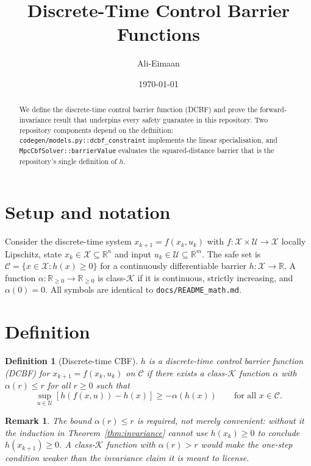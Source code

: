\documentclass[11pt]{article}
\title{Discrete-Time Control Barrier Functions}
\author{Ali-Eimaan}
\date{\today}
\newtheorem{definition}{Definition}
\newtheorem{remark}{Remark}
\begin{document}
\maketitle

\begin{abstract}
We define the discrete-time control barrier function (DCBF) and prove the forward-invariance
result that underpins every safety guarantee in this repository. Two repository components depend
on the definition: \texttt{codegen/models.py::dcbf\_constraint} implements the linear
specialisation, and \texttt{MpcCbfSolver::barrierValue} evaluates the squared-distance barrier
that is the repository's single definition of $h$.
\end{abstract}

\section{Setup and notation}
Consider the discrete-time system $x_{k+1} = f(x_k, u_k)$ with $f : \mathcal{X} \times
\mathcal{U} \to \mathcal{X}$ locally Lipschitz, state $x_k \in \mathcal{X} \subseteq
\mathbb{R}^n$ and input $u_k \in \mathcal{U} \subseteq \mathbb{R}^m$. The safe set is
$\mathcal{C} = \{x \in \mathcal{X} : h(x) \ge 0\}$ for a continuously differentiable barrier
$h : \mathcal{X} \to \mathbb{R}$. A function $\alpha : \mathbb{R}_{\ge 0} \to \mathbb{R}_{\ge 0}$
is class-$\mathcal{K}$ if it is continuous, strictly increasing, and $\alpha(0) = 0$. All symbols
are identical to \texttt{docs/README\_math.md}.

\section{Definition}
\begin{definition}[Discrete-time CBF]
$h$ is a discrete-time control barrier function (DCBF) for $x_{k+1} = f(x_k, u_k)$ on
$\mathcal{C}$ if there exists a class-$\mathcal{K}$ function $\alpha$ with $\alpha(r) \le r$ for
all $r \ge 0$ such that
\[
\sup_{u \in \mathcal{U}} \left[ h(f(x,u)) - h(x) \right] \ge -\alpha(h(x))
\qquad \text{for all } x \in \mathcal{C}.
\]
\end{definition}

\begin{remark}
The bound $\alpha(r) \le r$ is required, not merely convenient: without it the induction in
Theorem~\ref{thm:invariance} cannot use $h(x_k) \ge 0$ to conclude $h(x_{k+1}) \ge 0$. A
class-$\mathcal{K}$ function with $\alpha(r) > r$ would make the one-step condition weaker than
the invariance claim it is meant to license.
\end{remark}
\end{document}
